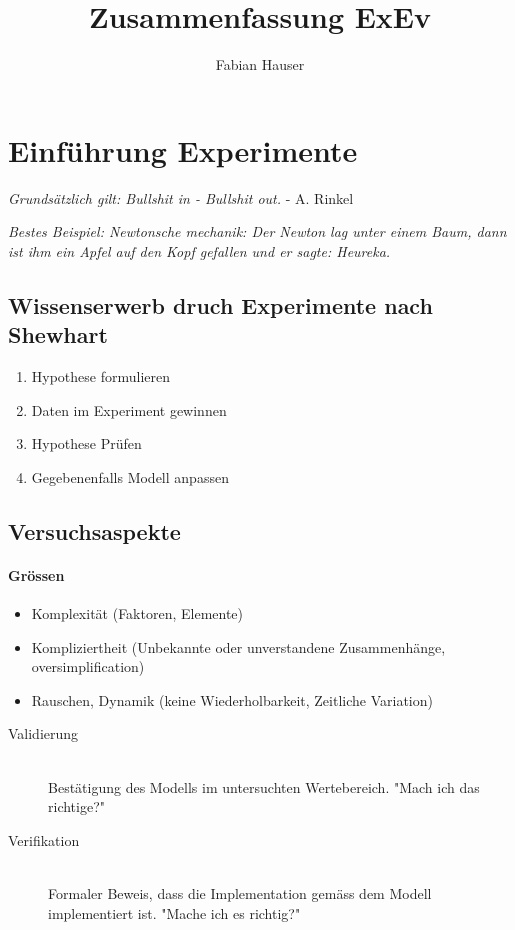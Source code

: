 

\usepackage{tikz}
\usetikzlibrary{shapes,backgrounds}


\title{Zusammenfassung ExEv}
\author{Fabian Hauser}
 

\maketitle

\section{Einführung Experimente}

\emph{Grundsätzlich gilt: Bullshit in - Bullshit out.} - A. Rinkel

\emph{Bestes Beispiel: Newtonsche mechanik: Der Newton lag unter einem Baum, dann ist ihm ein Apfel auf den Kopf gefallen und er sagte: Heureka.}

\subsection{Wissenserwerb druch Experimente nach Shewhart}
\begin{enumerate}
	\item	Hypothese formulieren
	\item	Daten im Experiment gewinnen
	\item	Hypothese Prüfen
	\item	Gegebenenfalls Modell anpassen
\end{enumerate}

\subsection{Versuchsaspekte}
\paragraph{Grössen}
\begin{itemize}
	\item	Komplexität			(Faktoren, Elemente)
	\item	Kompliziertheit		(Unbekannte oder unverstandene Zusammenhänge, oversimplification)
	\item	Rauschen, Dynamik	(keine Wiederholbarkeit, Zeitliche Variation)
\end{itemize}

\begin{description}
	\item[Validierung] \hfill \\
		Bestätigung des Modells im untersuchten Wertebereich. "Mach ich das richtige?"
	\item[Verifikation] \hfill \\
		Formaler Beweis, dass die Implementation gemäss dem Modell implementiert ist. "Mache ich es richtig?"
\end{description}

